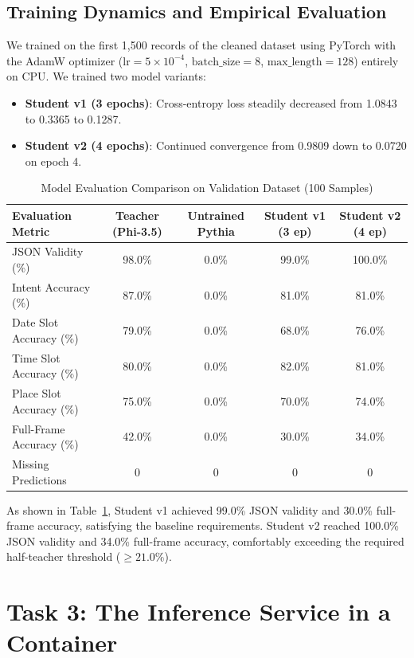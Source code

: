 \documentclass[10pt,a4paper]{article}
\begin{document}
\subsection{Training Dynamics and Empirical Evaluation}
We trained on the first 1,500 records of the cleaned dataset using PyTorch with the AdamW optimizer ($\text{lr} = 5 \times 10^{-4}$, $\text{batch\_size} = 8$, $\text{max\_length} = 128$) entirely on CPU. We trained two model variants:
\begin{itemize}
    \item \textbf{Student v1 (3 epochs)}: Cross-entropy loss steadily decreased from 1.0843 to 0.3365 to 0.1287.
    \item \textbf{Student v2 (4 epochs)}: Continued convergence from 0.9809 down to 0.0720 on epoch 4.
\end{itemize}

\begin{table}[h]
\centering
\small
\caption{Model Evaluation Comparison on Validation Dataset (100 Samples)}
\label{tab:model_comparison}
\begin{tabular}{|l|c|c|c|c|}
\hline
\textbf{Evaluation Metric} & \textbf{Teacher (Phi-3.5)} & \textbf{Untrained Pythia} & \textbf{Student v1 (3 ep)} & \textbf{Student v2 (4 ep)} \\
\hline
JSON Validity (\%) & 98.0\% & 0.0\% & 99.0\% & 100.0\% \\
\hline
Intent Accuracy (\%) & 87.0\% & 0.0\% & 81.0\% & 81.0\% \\
\hline
Date Slot Accuracy (\%) & 79.0\% & 0.0\% & 68.0\% & 76.0\% \\
\hline
Time Slot Accuracy (\%) & 80.0\% & 0.0\% & 82.0\% & 81.0\% \\
\hline
Place Slot Accuracy (\%) & 75.0\% & 0.0\% & 70.0\% & 74.0\% \\
\hline
Full-Frame Accuracy (\%) & 42.0\% & 0.0\% & 30.0\% & 34.0\% \\
\hline
Missing Predictions & 0 & 0 & 0 & 0 \\
\hline
\end{tabular}
\end{table}

As shown in Table~\ref{tab:model_comparison}, Student v1 achieved 99.0\% JSON validity and 30.0\% full-frame accuracy, satisfying the baseline requirements. Student v2 reached 100.0\% JSON validity and 34.0\% full-frame accuracy, comfortably exceeding the required half-teacher threshold ($\ge 21.0\%$).

\section{Task 3: The Inference Service in a Container}
\end{document}
